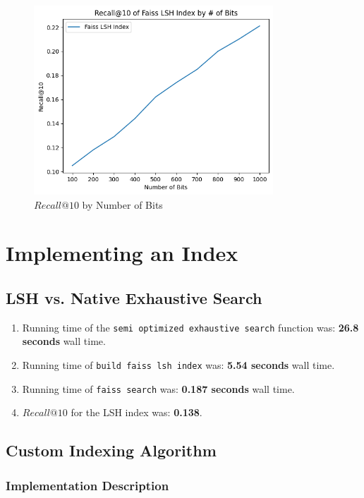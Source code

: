 \documentclass[12pt]{article}
\begin{document}
\begin{figure}[H]
    \centering
    \includegraphics[width=0.8\textwidth]{images/1_2_3.png}
    \caption{$Recall@10$ by Number of Bits}
\end{figure}

\newpage

\section{Implementing an Index}

\subsection{LSH vs. Native Exhaustive Search}

\begin{enumerate}
    \item Running time of the \texttt{semi optimized exhaustive search} function was: \textbf{26.8 seconds} wall time.
    \item Running time of \texttt{build faiss lsh index} was: \textbf{5.54 seconds} wall time.
    \item Running time of \texttt{faiss search} was: \textbf{0.187 seconds} wall time.
    \item $Recall@10$ for the LSH index was: \textbf{0.138}.
\end{enumerate}

\subsection{Custom Indexing Algorithm}

\subsubsection*{Implementation Description}
\end{document}
